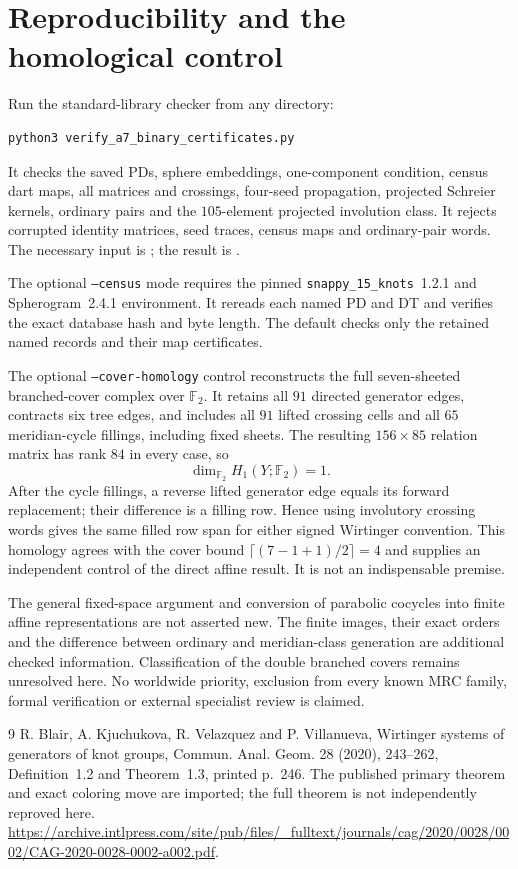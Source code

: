 \documentclass[11pt]{article}
\newcommand{\F}{\mathbb F}
\begin{document}
\section{Reproducibility and the homological control}

Run the standard-library checker from any directory:
\begin{verbatim}
python3 verify_a7_binary_certificates.py
\end{verbatim}
It checks the saved PDs, sphere embeddings, one-component condition,
census dart maps, all matrices and crossings, four-seed propagation,
projected Schreier kernels, ordinary pairs and the $105$-element
projected involution class. It rejects corrupted identity matrices,
seed traces, census maps and ordinary-pair words. The necessary input
is ; the result is
.

The optional \texttt{--census} mode requires the pinned
\texttt{snappy\_15\_knots}~1.2.1 and Spherogram~2.4.1 environment.
It rereads each named PD and DT and verifies the exact database hash
and byte length. The default checks only the retained named records
and their map certificates.

The optional \texttt{--cover-homology} control reconstructs the full
seven-sheeted branched-cover complex over $\F_2$. It retains all
$91$ directed generator edges, contracts six tree edges, and includes
all $91$ lifted crossing cells and all $65$ meridian-cycle fillings,
including fixed sheets. The resulting $156\times85$ relation matrix
has rank $84$ in every case, so
\[
                       \dim_{\F_2}H_1(Y;\F_2)=1.
\]
After the cycle fillings, a reverse lifted generator edge equals its
forward replacement; their difference is a filling row. Hence using
involutory crossing words gives the same filled row span for either
signed Wirtinger convention. This homology agrees with the cover
bound $\lceil(7-1+1)/2\rceil=4$ and supplies an independent control
of the direct affine result. It is not an indispensable premise.

The general fixed-space argument and conversion of parabolic
cocycles into finite affine representations are not asserted new.
The finite images, their exact orders and the difference between
ordinary and meridian-class generation are additional checked
information. Classification of the double branched covers remains
unresolved here. No worldwide priority, exclusion from every known
MRC family, formal verification or external specialist review is
claimed.

\begin{thebibliography}{9}
R. Blair, A. Kjuchukova, R. Velazquez and P. Villanueva,
Wirtinger systems of generators of knot groups,
Commun. Anal. Geom. 28 (2020), 243--262,
Definition~1.2 and Theorem~1.3, printed p.~246.
The published primary theorem and exact coloring move are imported;
the full theorem is not independently reproved here.
\url{https://archive.intlpress.com/site/pub/files/_fulltext/journals/cag/2020/0028/0002/CAG-2020-0028-0002-a002.pdf}.
\end{thebibliography}
\end{document}
